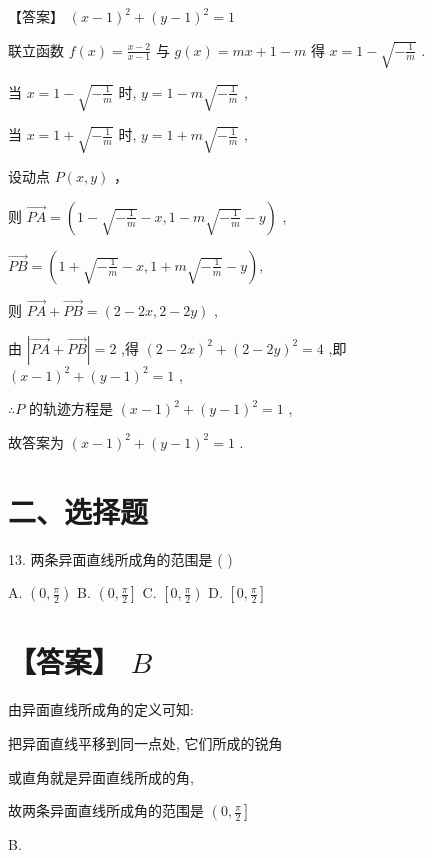 \documentclass[10pt]{article}
\begin{document}
【答案】 \({\left( x - 1\right) }^{2} + {\left( y - 1\right) }^{2} = 1\)

联立函数 \(f\left( x\right)  = \frac{x - 2}{x - 1}\) 与 \(g\left( x\right)  = {mx} + 1 - m\) 得 \(x = 1 - \sqrt{-\frac{1}{m}}\) .

当 \(x = 1 - \sqrt{-\frac{1}{m}}\) 时, \(y = 1 - m\sqrt{-\frac{1}{m}}\) ,

当 \(x = 1 + \sqrt{-\frac{1}{m}}\) 时, \(y = 1 + m\sqrt{-\frac{1}{m}}\) ,

设动点 \(P\left( {x,y}\right)\) ，

则 \(\overrightarrow{PA} = \left( {1 - \sqrt{-\frac{1}{m}} - x,1 - m\sqrt{-\frac{1}{m}} - y}\right)\) ,

\(\overrightarrow{PB} = \left( {1 + \sqrt{-\frac{1}{m}} - x,1 + m\sqrt{-\frac{1}{m}} - y}\right) ,\)

则 \(\overrightarrow{PA} + \overrightarrow{PB} = \left( {2 - {2x},2 - {2y}}\right)\) ,

由 \(\left| {\overrightarrow{PA} + \overrightarrow{PB}}\right|  = 2\) ,得 \({\left( 2 - 2x\right) }^{2} + {\left( 2 - 2y\right) }^{2} = 4\) ,即 \({\left( x - 1\right) }^{2} + {\left( y - 1\right) }^{2} = 1\) ,

\(\therefore P\) 的轨迹方程是 \({\left( x - 1\right) }^{2} + {\left( y - 1\right) }^{2} = 1\) ,

故答案为 \({\left( x - 1\right) }^{2} + {\left( y - 1\right) }^{2} = 1\) .

\section*{二、选择题}

13. 两条异面直线所成角的范围是 ( )

A. \(\left( {0,\frac{\pi }{2}}\right)\) B. \(\left( {0,\frac{\pi }{2}}\right\rbrack\) C. \(\left\lbrack  {0,\frac{\pi }{2}}\right)\) D. \(\left\lbrack  {0,\frac{\pi }{2}}\right\rbrack\)

\section*{【答案】 \(B\)}

由异面直线所成角的定义可知:

把异面直线平移到同一点处, 它们所成的锐角

或直角就是异面直线所成的角,

故两条异面直线所成角的范围是 \(\left( {0,\frac{\pi }{2}}\right\rbrack\)

B.
\end{document}
